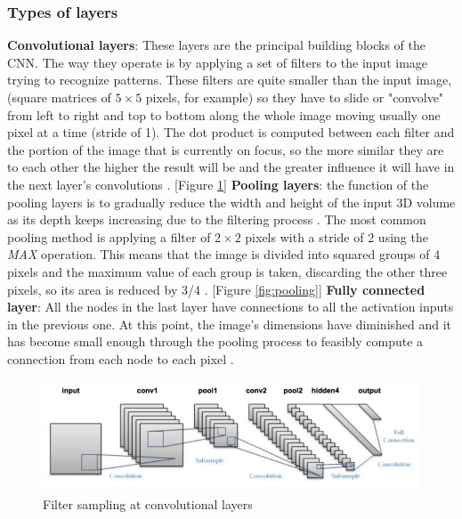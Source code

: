 \subsubsection{Types of layers}
\begin{outline}
	\1\textbf{Convolutional layers}: These layers are the principal building blocks of the CNN. The way they operate is by applying a set of filters to the input image trying to recognize patterns. These filters are quite smaller than the input image, (square matrices of $5\times5$ pixels, for example) so they have to slide or "convolve" from left to right and top to bottom along the whole image moving usually one pixel at a time (stride of 1). The dot product is computed between each filter and the portion of the image that is currently on focus, so the more similar they are to each other the higher the result will be and the greater influence it will have in the next layer's convolutions \cite{cs231n}. [Figure \ref{fig:convlayer}]
    \1\textbf{Pooling layers}: the function of the pooling layers is to gradually reduce the width and height of the input 3D volume as its depth keeps increasing due to the filtering process \cite{airola2017}. The most common pooling method is applying a filter of $2\times2$ pixels with a stride of 2 using the \textit{MAX} operation. This means that the image is divided into squared groups of 4 pixels and the maximum value of each group is taken, discarding the other three pixels, so its area is reduced by 3/4 \cite{cs231n}. [Figure \ref{fig:pooling}]
    \1\textbf{Fully connected layer}: All the nodes in the last layer have connections to all the activation inputs in the previous one. At this point, the image's dimensions have diminished and it has become small enough through the pooling process to feasibly compute a connection from each node to each pixel \cite{lee2009convolutional}. 
\end{outline}
\begin{figure}[h!]
  \includegraphics[width=\linewidth]{img/fullprocess.png}
  \caption{\small Filter sampling at convolutional layers}
  \label{fig:convlayer}
\end{figure}
